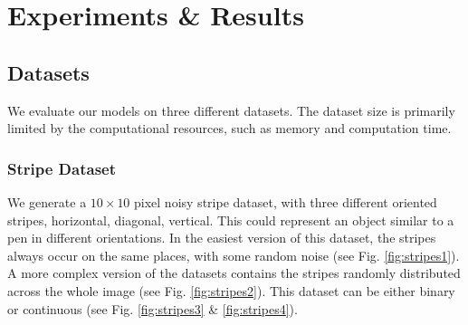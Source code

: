\chapter{Experiments \& Results} \label{c:expres}

\section{Datasets} \label{c:datasets}
 
We evaluate our models on three different datasets.
The dataset size is primarily limited by the computational resources, such as memory and computation time. 

\subsection{Stripe Dataset} \label{c:stripes}

We generate a $10 \times 10$ pixel noisy stripe dataset, with three different oriented stripes, horizontal, diagonal, vertical. 
This could represent an object similar to a pen in different orientations.
In the easiest version of this dataset, the stripes always occur on the same places, with some random noise (see Fig. \ref{fig:stripes1}).
A more complex version of the datasets contains the stripes randomly distributed across the whole image (see Fig. \ref{fig:stripes2}).
This dataset can be either binary or continuous (see Fig. \ref{fig:stripes3} \& \ref{fig:stripes4}).


